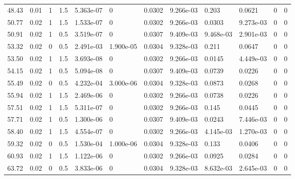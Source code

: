 \documentclass[preview]{standalone}
\begin{document}
{{\begin{tabular}{L{1.2cm}C{1.2cm} C{0.3cm}C{0.5cm} C{1.4cm}C{1.4cm} C{1.4cm}C{1.4cm} C{1.6cm}C{1.6cm} C{1.6cm}C{1.6cm}}
  48.43  &  0.01  & 1     & 1.5 &  5.363e-07  & 0  &  0.0302&   9.266e-03& 0.203 & 0.0621   &  0 & 0  \\ 
  50.77  &  0.02  & 1     & 1.5 &  1.533e-07  & 0  &  0.0302&   9.266e-03& 0.0303 & 9.273e-03   &  0 & 0  \\ 
  50.91  &  0.02  & 1     & 0.5 &  3.519e-07  & 0  &  0.0307&   9.409e-03& 9.468e-03 & 2.901e-03   &  0 & 0  \\ 
  53.32  &  0.02  & 0     & 0.5 &  2.491e-03  & 1.900e-05  &  0.0304&   9.328e-03& 0.211 & 0.0647   &  0 & 0  \\ 
  53.50  &  0.02  & 1     & 1.5 &  3.693e-08  & 0  &  0.0302&   9.266e-03& 0.0145 & 4.449e-03   &  0 & 0  \\ 
  54.15  &  0.02  & 1     & 0.5 &  5.094e-08  & 0  &  0.0307&   9.409e-03& 0.0739 & 0.0226   &  0 & 0  \\ 
  55.49  &  0.02  & 0     & 0.5 &  4.232e-04  & 3.000e-06  &  0.0304&   9.328e-03& 0.0873 & 0.0268   &  0 & 0  \\ 
  55.94  &  0.02  & 1     & 1.5 &  2.469e-06  & 0  &  0.0302&   9.266e-03& 0.0738 & 0.0226   &  0 & 0  \\ 
  57.51  &  0.02  & 1     & 1.5 &  5.311e-07  & 0  &  0.0302&   9.266e-03& 0.145 & 0.0445   &  0 & 0  \\ 
  57.71  &  0.02  & 1     & 0.5 &  1.300e-06  & 0  &  0.0307&   9.409e-03& 0.0243 & 7.446e-03   &  0 & 0  \\ 
  58.40  &  0.02  & 1     & 1.5 &  4.554e-07  & 0  &  0.0302&   9.266e-03& 4.145e-03 & 1.270e-03   &  0 & 0  \\ 
  59.32  &  0.02  & 0     & 0.5 &  1.530e-04  & 1.000e-06  &  0.0304&   9.328e-03& 0.133 & 0.0406   &  0 & 0  \\ 
  60.93  &  0.02  & 1     & 1.5 &  1.122e-06  & 0  &  0.0302&   9.266e-03& 0.0925 & 0.0284   &  0 & 0  \\ 
  63.72  &  0.02  & 0     & 0.5 &  3.833e-06  & 0  &  0.0304&   9.328e-03& 8.632e-03 & 2.645e-03   &  0 & 0  \\ 
\hline 
\end{tabular} 

}}
\end{document}

